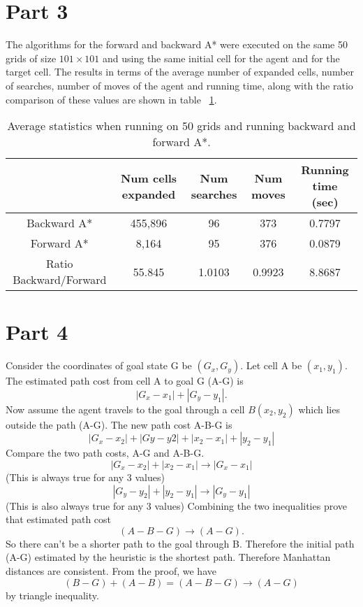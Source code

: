 \documentclass{article}
\begin{document}
\section*{Part 3}

The algorithms for the forward and backward A* were executed on the same 50 grids of size $101 \times 101$ and using the same initial cell for the agent and for the target cell. The results in terms of the average number of expanded cells, number of searches, number of moves of the agent and running time, along with the ratio comparison of these values are shown in table~ \ref{tab:back_for}.

\begin{table}[h]
  \begin{center}
    \begin{tabular}{|*{5}{c|}}
      \cline{2-5}
      \multicolumn{1}{c|}{} & Num cells expanded & Num searches & Num moves & Running time (sec) \\ \hline
      Backward A* & 455,896 & 96 & 373 & 0.7797\\ \hline 
      Forward A*  & 8,164  & 95 & 376 & 0.0879 \\ \hline \hline
      Ratio Backward/Forward & 55.845 & 1.0103 & 0.9923 & 8.8687 \\ \hline
    \end{tabular}
  \end{center}
  \caption{Average statistics when running on 50 grids and running backward and forward A*.}
  \label{tab:back_for}
\end{table}

\section*{Part 4}
Consider the coordinates of goal state G be $(G_x,G_y)$. Let cell A be $(x_1,y_1)$. The estimated path cost from cell A to goal G (A-G) is $$|G_x-x_1|+|G_y-y_1|.$$ Now assume the agent travels to the goal through a cell $B (x_2,y_2)$ which lies outside the path (A-G). The new path cost A-B-G is $$|G_x- x_2|+|Gy-y2|+|x_2-x_1|+|y_2-y_1|$$
Compare the two path costs, A-G and A-B-G.
\\
$$|G_x-x_2|+|x_2-x_1| \rightarrow  |G_x-x_1|$$(This is always true for any 3 values) $$ |G_y-y_2|+|y_2-y_1|   \rightarrow |G_y-y_1|$$(This is also always true for any 3 values)
Combining the two inequalities prove that estimated path cost $$(A-B-G) \rightarrow (A-G). $$So there can't be a shorter path to the goal through B. Therefore the initial path (A-G) estimated by the heuristic is the shortest path. Therefore Manhattan distances are consistent.
From the proof, we have $$(B-G)+(A-B)=(A-B-G) \rightarrow (A-G)$$  by triangle inequality.
\end{document}
